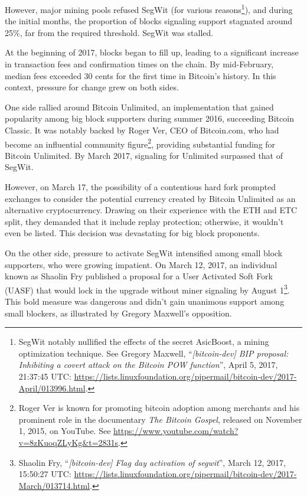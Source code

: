 \documentclass[
  a5paper,
  smalldemyvopaper,10pt,twoside,onecolumn,openright,extrafontsizes,hidelinks]{memoir}
\begin{document}
However, major mining pools refused SegWit (for various
reasons\footnote{SegWit notably nullified the effects of the secret
  AsicBoost, a mining optimization technique. See Gregory Maxwell,
  ``\emph{{[}bitcoin-dev{]} BIP proposal: Inhibiting a covert attack on
  the Bitcoin POW function}'', April 5, 2017, 21:37:45 UTC:
  \url{https://lists.linuxfoundation.org/pipermail/bitcoin-dev/2017-April/013996.html}.}),
and during the initial months, the proportion of blocks signaling
support stagnated around 25\%, far from the required threshold. SegWit
was stalled.

At the beginning of 2017, blocks began to fill up, leading to a
significant increase in transaction fees and confirmation times on the
chain. By mid-February, median fees exceeded 30 cents for the first time
in Bitcoin's history. In this context, pressure for change grew on both
sides.

One side rallied around Bitcoin Unlimited, an implementation that gained
popularity among big block supporters during summer 2016, succeeding
Bitcoin Classic. It was notably backed by Roger Ver, CEO of Bitcoin.com,
who had become an influential community figure\footnote{Roger Ver is
  known for promoting bitcoin adoption among merchants and his prominent
  role in the documentary \emph{The Bitcoin Gospel}, released on
  November 1, 2015, on YouTube. See
  \url{https://www.youtube.com/watch?v=8zKuoqZLyKg&t=2831s}.}, providing
substantial funding for Bitcoin Unlimited. By March 2017, signaling for
Unlimited surpassed that of SegWit.

However, on March 17, the possibility of a contentious hard fork
prompted exchanges to consider the potential currency created by Bitcoin
Unlimited as an alternative cryptocurrency. Drawing on their experience
with the ETH and ETC split, they demanded that it include replay
protection; otherwise, it wouldn't even be listed. This decision was
devastating for big block proponents.

On the other side, pressure to activate SegWit intensified among small
block supporters, who were growing impatient. On March 12, 2017, an
individual known as Shaolin Fry published a proposal for a User
Activated Soft Fork (UASF) that would lock in the upgrade without miner
signaling by August 1\footnote{Shaolin Fry, ``\emph{{[}bitcoin-dev{]}
  Flag day activation of segwit}'', March 12, 2017, 15:50:27 UTC:
  \url{https://lists.linuxfoundation.org/pipermail/bitcoin-dev/2017-March/013714.html}.}.
This bold measure was dangerous and didn't gain unanimous support among
small blockers, as illustrated by Gregory Maxwell's opposition.
\end{document}
